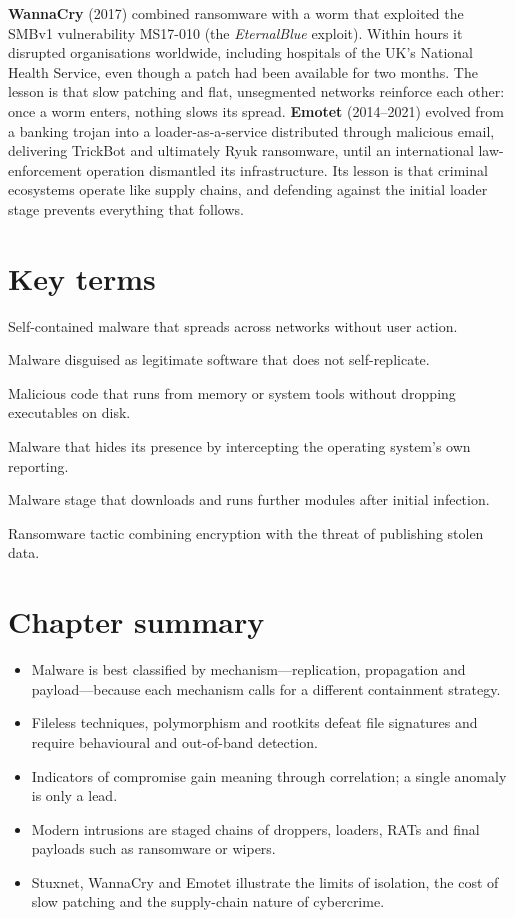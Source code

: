 \documentclass[11pt,openany]{book}
\begin{document}
\textbf{WannaCry} (2017) combined ransomware with a worm that exploited the SMBv1 vulnerability MS17-010 (the \emph{EternalBlue} exploit). Within hours it disrupted organisations worldwide, including hospitals of the UK's National Health Service, even though a patch had been available for two months. The lesson is that slow patching and flat, unsegmented networks reinforce each other: once a worm enters, nothing slows its spread. \textbf{Emotet} (2014–2021) evolved from a banking trojan into a loader-as-a-service distributed through malicious email, delivering TrickBot and ultimately Ryuk ransomware, until an international law-enforcement operation dismantled its infrastructure. Its lesson is that criminal ecosystems operate like supply chains, and defending against the initial loader stage prevents everything that follows.

\section*{Key terms}
\begin{description}[style=nextline,leftmargin=1.2em]
  \item[Worm] Self-contained malware that spreads across networks without user action.
  \item[Trojan] Malware disguised as legitimate software that does not self-replicate.
  \item[Fileless malware] Malicious code that runs from memory or system tools without dropping executables on disk.
  \item[Rootkit] Malware that hides its presence by intercepting the operating system's own reporting.
  \item[Loader] Malware stage that downloads and runs further modules after initial infection.
  \item[Double extortion] Ransomware tactic combining encryption with the threat of publishing stolen data.
\end{description}

\section*{Chapter summary}
\begin{itemize}
  \item Malware is best classified by mechanism—replication, propagation and payload—because each mechanism calls for a different containment strategy.
  \item Fileless techniques, polymorphism and rootkits defeat file signatures and require behavioural and out-of-band detection.
  \item Indicators of compromise gain meaning through correlation; a single anomaly is only a lead.
  \item Modern intrusions are staged chains of droppers, loaders, RATs and final payloads such as ransomware or wipers.
  \item Stuxnet, WannaCry and Emotet illustrate the limits of isolation, the cost of slow patching and the supply-chain nature of cybercrime.
\end{itemize}
\end{document}
